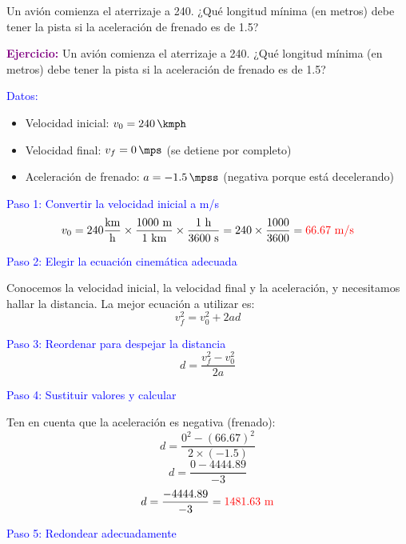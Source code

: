 \begin{exercise}
    Un avión comienza el aterrizaje a \qty{240}{\kmph}.
    ¿Qué longitud mínima (en metros) debe tener la pista si la aceleración de frenado es de \qty{1.5}{\mpss}?
    \begin{solu}
        \textbf{\textcolor{purple}{Ejercicio:}} Un avión comienza el aterrizaje a \qty{240}{\kmph}.
        ¿Qué longitud mínima (en metros) debe tener la pista si la aceleración de frenado es de \qty{1.5}{\mpss}?

        \vspace{0.3cm}

        \textcolor{blue}{Datos:}
        \begin{itemize}
            \item Velocidad inicial: $v_0 = \qty{240}{\kmph}$
            \item Velocidad final: $v_f = \qty{0}{\mps}$ (se detiene por completo)
            \item Aceleración de frenado: $a = \qty{-1.5}{\mpss}$ (negativa porque está decelerando)
        \end{itemize}

        \textcolor{blue}{Paso 1: Convertir la velocidad inicial a m/s}
        \[
            v_0 = 240 \frac{\text{km}}{\text{h}} \times \frac{1000 \text{ m}}{1 \text{ km}} \times \frac{1 \text{ h}}{3600 \text{ s}} = 240 \times \frac{1000}{3600} = \textcolor{red}{66.67 \text{ m/s}}
        \]

        \textcolor{blue}{Paso 2: Elegir la ecuación cinemática adecuada}

        Conocemos la velocidad inicial, la velocidad final y la aceleración, y necesitamos hallar la distancia. La mejor ecuación a utilizar es:
        \[
            \boxed{v_f^2 = v_0^2 + 2ad}
        \]

        \textcolor{blue}{Paso 3: Reordenar para despejar la distancia}
        \[
            d = \frac{v_f^2 - v_0^2}{2a}
        \]

        \textcolor{blue}{Paso 4: Sustituir valores y calcular}

        Ten en cuenta que la aceleración es negativa (frenado):
        \[
            d = \frac{0^2 - (66.67)^2}{2 \times (-1.5)}
        \]
        \[
            d = \frac{0 - 4444.89}{-3}
        \]
        \[
            d = \frac{-4444.89}{-3} = \textcolor{red}{1481.63 \text{ m}}
        \]

        \textcolor{blue}{Paso 5: Redondear adecuadamente}


\end{solu}
\end{exercise}
